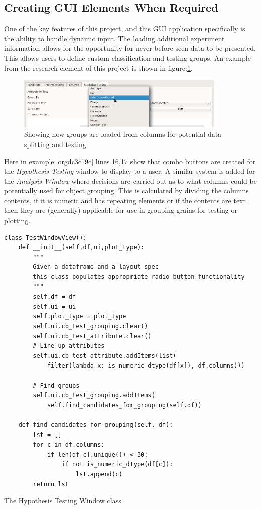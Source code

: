 \documentclass[11pt]{report}
\begin{document}
\subsection{Creating GUI Elements When Required}
\label{sec:orgdb7e5ed}

One of the key features of this project, and this GUI application specifically is the ability to handle dynamic input. The loading additional experiment information allows for the opportunity for never-before seen data to be presented. This allows users to define custom classification and testing groups. An example from the research element of this project is shown in figure:\ref{fig:org5bcefb9}.

\begin{figure}[htbp]
\centering
\includegraphics[width=10cm]{./images/dynamicselection.png}
\caption{\label{fig:org5bcefb9}
Showing how groups are loaded from columns for potential data splitting and testing}
\end{figure}

Here in example:\ref{orgdc3c19c} lines 16,17 show that combo buttons are created for the \emph{Hypothesis Testing} window to display to a user. A similar system is added for the \emph{Analysis Window} where decisions are carried out as to what columns could be potentially used for object grouping. This is calculated by dividing the columns contents, if it is numeric and has repeating elements or if the contents are text then they are (generally) applicable for use in grouping grains for testing or plotting.

\begin{listing}[htbp]
\begin{verbatim}
class TestWindowView():
    def __init__(self,df,ui,plot_type):
        """
        Given a dataframe and a layout spec
        this class populates appropriate radio button functionality
        """
        self.df = df
        self.ui = ui
        self.plot_type = plot_type
        self.ui.cb_test_grouping.clear()
        self.ui.cb_test_attribute.clear()
        # Line up attributes
        self.ui.cb_test_attribute.addItems(list(
            filter(lambda x: is_numeric_dtype(df[x]), df.columns)))

        # Find groups
        self.ui.cb_test_grouping.addItems(
            self.find_candidates_for_grouping(self.df))

    def find_candidates_for_grouping(self, df):
        lst = []
        for c in df.columns:
            if len(df[c].unique()) < 30:
                if not is_numeric_dtype(df[c]):
                    lst.append(c)
        return lst
\end{verbatim}
\caption{\label{orgdc3c19c}
The Hypothesis Testing Window class}
\end{listing}
\end{document}
